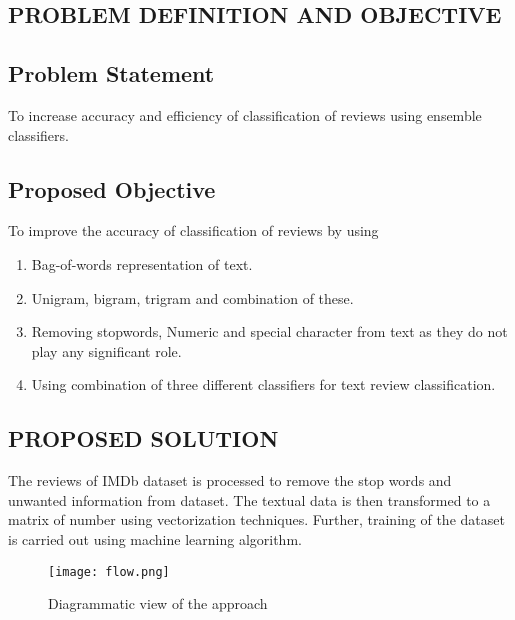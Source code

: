 \documentclass[10pt]{article}
\begin{document}
{\newpage
\begin{center}

\section{PROBLEM DEFINITION AND OBJECTIVE}

\end{center}
\subsection{Problem Statement}

\hspace{5mm}
To increase accuracy and efficiency of classification of reviews using ensemble classifiers.
\hspace{5mm}


\subsection{Proposed Objective}
To improve the accuracy of classification of reviews by  using
\begin{enumerate}
\item Bag-of-words representation of text.
\item Unigram, bigram, trigram and combination of these.
\item Removing stopwords, Numeric and special character from text as they do not play any significant role.
\item Using combination of three different classifiers for text review classification. 

\end{enumerate}


\newpage
\begin{center}

\section{PROPOSED SOLUTION}

\end{center}

The reviews of IMDb dataset is processed to remove the stop
words and unwanted information from dataset. The textual data is
then transformed to a matrix of number using vectorization 
techniques. Further, training of the dataset is carried out using machine
learning algorithm.
\begin{figure}[!h]
\centering
\texttt{[image: flow.png]}
\caption{Diagrammatic view of the approach}
\end{figure}

}
\end{document}
